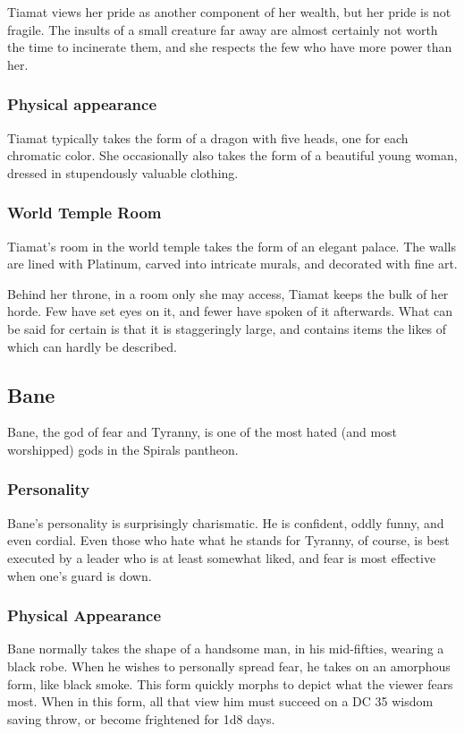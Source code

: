 \begin{multicols}{2}
Tiamat views her pride as another component of her wealth, but her pride is not fragile.
The insults of a small creature far away are almost certainly not worth the time to incinerate them, and she respects the few who have more power than her.

\subsubsection*{Physical appearance}
Tiamat typically takes the form of a dragon with five heads, one for each chromatic color.
She occasionally also takes the form of a beautiful young woman, dressed in stupendously valuable clothing.

\subsubsection*{World Temple Room}
Tiamat's room in the world temple takes the form of an elegant palace.
The walls are lined with Platinum, carved into intricate murals, and decorated with fine art.

Behind her throne, in a room only she may access, Tiamat keeps the bulk of her horde.
Few have set eyes on it, and fewer have spoken of it afterwards.
What can be said for certain is that it is staggeringly large, and contains items the likes of which can hardly be described.

\subsection*{Bane}
\begin{goddesc}
\end{goddesc}
Bane, the god of fear and Tyranny, is one of the most hated (and most worshipped) gods in the Spirals pantheon.

\subsubsection*{Personality}
Bane's personality is surprisingly charismatic.
He is confident, oddly funny, and even cordial.
Even those who hate what he stands for 
Tyranny, of course, is best executed by a leader who is at least somewhat liked, and fear is most effective when one's guard is down.

\subsubsection*{Physical Appearance}
Bane normally takes the shape of a handsome man, in his mid-fifties, wearing a black robe.
When he wishes to personally spread fear, he takes on an amorphous form, like black smoke.
This form quickly morphs to depict what the viewer fears most.
When in this form, all that view him must succeed on a DC 35 wisdom saving throw, or become frightened for 1d8 days.


\end{multicols}
